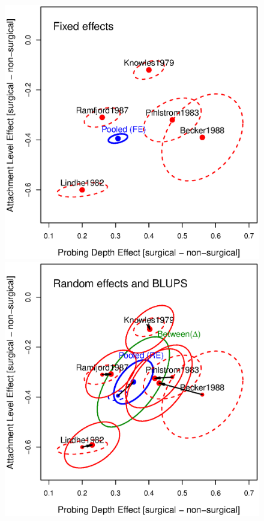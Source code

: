 \begin{figure}[htb]
 \begin{minipage}[b]{.49\linewidth}
  \centering
  \includegraphics[width=1\linewidth]{fig/mvmeta2a}
 \end{minipage}%
 \hfill
 \begin{minipage}[b]{.49\linewidth}
  \centering
  \includegraphics[width=1\linewidth]{fig/mvmeta2b}

\end{minipage}
\end{figure}
